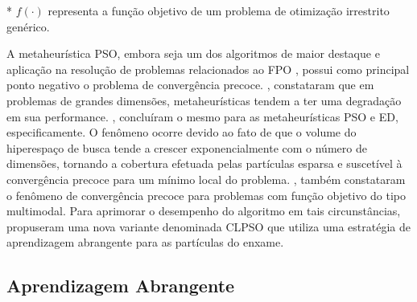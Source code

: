 \documentclass[
	12pt,				%
	openany,			%
	twoside,			%
	a4paper,			%
	chapter=TITLE,		%
	section=Title,		%
	subsection=Title,	%
	subsubsection=Title,%
	english,			%
	french,				%
	spanish,			%
	brazil			%
	]{abntex2}
\begin{document}
\begin{ERRATA}
\begin{algorithm}[t]
{
}

* $f(\cdot)$ representa a função objetivo de um problema de otimização irrestrito genérico.\\
\end{algorithm}


A metaheurística PSO, embora seja um dos algoritmos de maior destaque e aplicação na resolução de problemas relacionados ao FPO \cite{abbas, metareview}, possui como principal ponto negativo o problema de convergência precoce. , constataram que em problemas de grandes dimensões, metaheurísticas tendem a ter uma degradação em sua performance. , concluíram o mesmo para as metaheurísticas PSO e ED, especificamente. O fenômeno ocorre devido ao fato de que o volume do hiperespaço de busca tende a crescer exponencialmente com o número de dimensões, tornando a cobertura efetuada pelas partículas esparsa e suscetível à convergência precoce para um mínimo local do problema. , também constataram o fenômeno de convergência precoce para problemas com função objetivo do tipo multimodal. Para aprimorar o desempenho do algoritmo em tais circunstâncias, propuseram uma nova variante denominada CLPSO que utiliza uma estratégia de aprendizagem abrangente para as partículas do enxame.


\subsection{Aprendizagem Abrangente}


\end{ERRATA}
\end{document}

